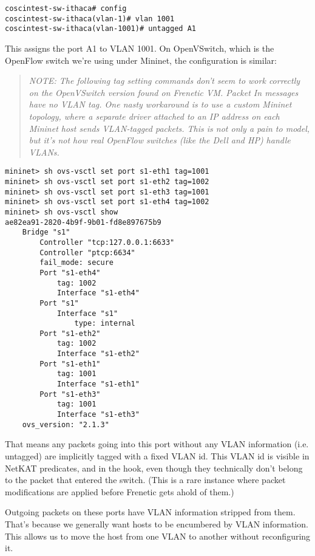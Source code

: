 \begin{verbatim}
coscintest-sw-ithaca# config
coscintest-sw-ithaca(vlan-1)# vlan 1001
coscintest-sw-ithaca(vlan-1001)# untagged A1
\end{verbatim}

This assigns the port A1 to VLAN 1001.  On OpenVSwitch, which is the OpenFlow switch we're using under Mininet, 
the configuration is similar:

\begin{quotation}
\emph{NOTE: The following tag setting commands don't seem to work correctly on the OpenVSwitch version found on
Frenetic VM.  Packet In messages have no VLAN tag.  One nasty workaround is to use a custom Mininet 
topology, where a separate driver attached to an IP address on each Mininet host sends VLAN-tagged packets.
This is not only a pain to model, but it's not how real OpenFlow switches (like the Dell and HP) handle
VLANs.  }
\end{quotation}

\begin{verbatim}
mininet> sh ovs-vsctl set port s1-eth1 tag=1001
mininet> sh ovs-vsctl set port s1-eth2 tag=1002
mininet> sh ovs-vsctl set port s1-eth3 tag=1001
mininet> sh ovs-vsctl set port s1-eth4 tag=1002
mininet> sh ovs-vsctl show
ae82ea91-2820-4b9f-9b01-fd8e897675b9
    Bridge "s1"
        Controller "tcp:127.0.0.1:6633"
        Controller "ptcp:6634"
        fail_mode: secure
        Port "s1-eth4"
            tag: 1002
            Interface "s1-eth4"
        Port "s1"
            Interface "s1"
                type: internal
        Port "s1-eth2"
            tag: 1002
            Interface "s1-eth2"
        Port "s1-eth1"
            tag: 1001
            Interface "s1-eth1"
        Port "s1-eth3"
            tag: 1001
            Interface "s1-eth3"
    ovs_version: "2.1.3"
\end{verbatim}

That means any packets going into this port without any VLAN
information (i.e. untagged) are implicitly tagged with a fixed VLAN id.   This VLAN id is visible in NetKAT
predicates, and in the  hook, even though they technically don't belong to the 
packet that entered the switch.  (This is a rare instance where packet modifications are applied
before Frenetic gets ahold of them.)

Outgoing packets on these ports have VLAN information stripped from them.  That's because we generally 
want hosts to be encumbered by VLAN information.  This allows us to move the host from one VLAN to another
without reconfiguring it.  

